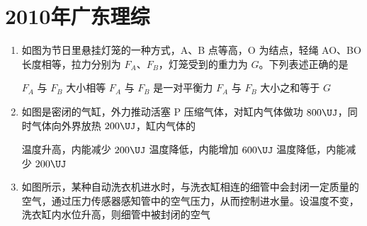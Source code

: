 \documentclass[\gkver]{gaokaozhenti}
\begin{document}
\chapter{2010年广东理综}

\begin{enumerate}
\item
如图为节日里悬挂灯笼的一种方式，A、B 点等高，O 为结点，轻绳 AO、BO 长度相等，拉力分别为 $F_{A}$、$F_{B}$，灯笼受到的重力为 $G$。下列表述正确的是


{$F_{A}$ 与 $F_{B}$ 大小相等}
{$F_{A}$ 与 $F_{B}$ 是一对平衡力}
{$F_{A}$ 与 $F_{B}$ 大小之和等于 $G$}


\item
如图是密闭的气缸，外力推动活塞 P 压缩气体，对缸内气体做功 $800\UJ$，同时气体向外界放热 $200\UJ$，缸内气体的


{温度升高，内能减少 $200\UJ$}
{温度降低，内能增加 $600\UJ$}
{温度降低，内能减少 $200\UJ$}


\item
如图所示，某种自动洗衣机进水时，与洗衣缸相连的细管中会封闭一定质量的空气，通过压力传感器感知管中的空气压力，从而控制进水量。设温度不变，洗衣缸内水位升高，则细管中被封闭的空气



\end{enumerate}
\end{document}
